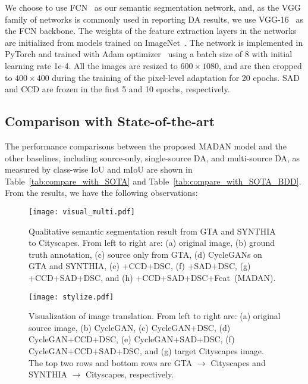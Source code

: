 \documentclass{article}
\begin{document}
We choose to use FCN~\cite{long2015fully} as our semantic segmentation network, and, as the VGG family of networks is commonly used in reporting DA results, we use VGG-16~\cite{vgg} as the FCN backbone. The weights of the feature extraction layers in the networks are initialized from models trained on ImageNet~\cite{deng2009imagenet}. The network is implemented in PyTorch and trained with Adam optimizer~\cite{adam} using a batch size of 8 with initial learning rate 1e-4. All the images are resized to $600\times1080$, and are then cropped to $400\times400$ during the training of the pixel-level adaptation for 20 epochs. SAD and CCD are frozen in the first 5 and 10 epochs, respectively.


















\subsection{Comparison with State-of-the-art}
The performance comparisons between the proposed MADAN model and the other baselines, including source-only, single-source DA, and multi-source DA, as measured by class-wise IoU and mIoU are shown in Table~\ref{tab:compare_with_SOTA} and Table~\ref{tab:compare_with_SOTA_BDD}. From the results, we have the following observations:


\begin{figure}
\centering
\texttt{[image: visual\_multi.pdf]}
\caption{Qualitative semantic segmentation result from GTA and SYNTHIA to Cityscapes. From left to right are: (a) original image, (b) ground truth annotation, (c) source only from GTA, (d) CycleGANs on GTA and SYNTHIA, (e) +CCD+DSC, (f) +SAD+DSC, (g) +CCD+SAD+DSC, and (h) +CCD+SAD+DSC+Feat~(MADAN).}
\label{fig:visual_multi}
\end{figure}

\begin{figure}
\centering
\texttt{[image: stylize.pdf]}
\caption{Visualization of image translation. From left to right are: (a) original source image, (b) CycleGAN, (c) CycleGAN+DSC, (d) CycleGAN+CCD+DSC, (e) CycleGAN+SAD+DSC, (f) CycleGAN+CCD+SAD+DSC, and (g) target Cityscapes image. The top two rows and bottom rows are GTA $\rightarrow$ Cityscapes and SYNTHIA $\rightarrow$  Cityscapes, respectively.}
\label{fig:stylize}
\end{figure}
\end{document}
